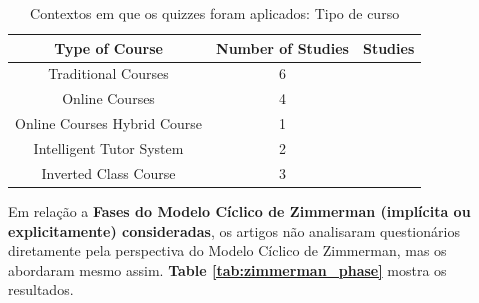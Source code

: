 \begin{table}[ht]
    \centering
        \caption{Contextos em que os quizzes foram aplicados: Tipo de curso}
        \begin{tabular}{c|c|c}
            \hline
                \textbf{Type of Course} & \textbf{Number of Studies}  & \textbf{Studies} \\
            \hline
            \hline
                Traditional Courses &
                6 & 
                \cite{petri_quality_2017, coore_facilitating_2019, luxton-reilly_introductory_2018, acharya_infusing_2017, thevathayan_imparting_2017, wu_improvement_2011} \\
            \hline
                Online Courses &
                4 &
                \cite{figueiredo_evaluation_2014, ogawa_evaluation_2018, krugel_computational_2017, verdu_distributed_2012} \\
            \hline
            Online Courses
                Hybrid Course &
                1 &
                \cite{figueiredo_evaluation_2014} \\
            \hline
                Intelligent Tutor System &
                2 &
                \cite{crow_intelligent_2018, thevathayan_imparting_2017} \\
            \hline
                Inverted Class Course &
                3 &
                \cite{ogawa_evaluation_2018, herold_student_2012, coore_facilitating_2019} \\
            \hline
        \end{tabular}
    \label{tab:context_course_type}
\end{table}

Em relação a \textbf{Fases do Modelo Cíclico de Zimmerman (implícita ou explicitamente) consideradas}, os artigos não analisaram questionários diretamente pela perspectiva do Modelo Cíclico de Zimmerman, mas os abordaram mesmo assim. \textbf{Table \ref{tab:zimmerman_phase}} mostra os resultados.

